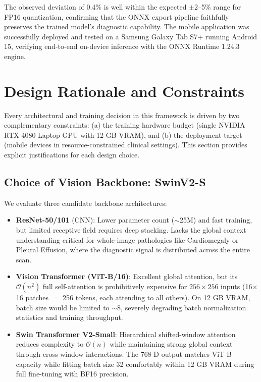 \documentclass[12pt,a4paper]{report}
\begin{document}
\noindent The observed deviation of 0.4\% is well within the expected $\pm$2--5\% range for FP16 quantization, confirming that the ONNX export pipeline faithfully preserves the trained model's diagnostic capability. The mobile application was successfully deployed and tested on a Samsung Galaxy Tab S7+ running Android 15, verifying end-to-end on-device inference with the ONNX Runtime 1.24.3 engine.

\section{Design Rationale and Constraints}

Every architectural and training decision in this framework is driven by two complementary constraints: (a) the training hardware budget (single NVIDIA RTX 4080 Laptop GPU with 12 GB VRAM), and (b) the deployment target (mobile devices in resource-constrained clinical settings). This section provides explicit justifications for each design choice.

\subsection{Choice of Vision Backbone: SwinV2-S}

We evaluate three candidate backbone architectures:

\begin{itemize}
    \item \textbf{ResNet-50/101} (CNN): Lower parameter count ($\sim$25M) and fast training, but limited receptive field requires deep stacking. Lacks the global context understanding critical for whole-image pathologies like Cardiomegaly or Pleural Effusion, where the diagnostic signal is distributed across the entire scan.
    
    \item \textbf{Vision Transformer (ViT-B/16)}: Excellent global attention, but its $\mathcal{O}(n^2)$ full self-attention is prohibitively expensive for $256 \times 256$ inputs (16$\times$16 patches $=$ 256 tokens, each attending to all others). On 12 GB VRAM, batch size would be limited to $\sim$8, severely degrading batch normalization statistics and training throughput.
    
    \item \textbf{Swin Transformer V2-Small}: Hierarchical shifted-window attention reduces complexity to $\mathcal{O}(n)$ while maintaining strong global context through cross-window interactions. The 768-D output matches ViT-B capacity while fitting batch size 32 comfortably within 12 GB VRAM during full fine-tuning with BF16 precision.
\end{itemize}
\end{document}
